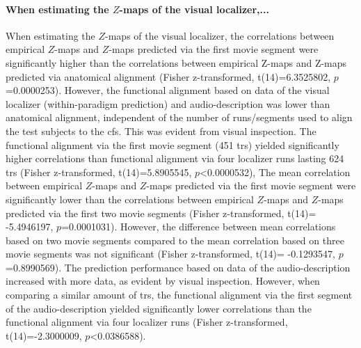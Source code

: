 \paragraph{When estimating the $Z$-maps of the visual localizer,...}
%
When estimating the $Z$-maps of the visual localizer, the correlations between
empirical $Z$-maps and $Z$-maps predicted via the first movie segment were
significantly higher than the correlations between empirical Z-maps and Z-maps
predicted via anatomical alignment (Fisher z-transformed, t(14)=6.3525802,
$p$=0.0000253).
%
However, the functional alignment based on data of the visual localizer
(within-paradigm prediction) and audio-description was lower than anatomical
alignment, independent of the number of runs/segments used to align the test
subjects to the \ac{cfs}. This was evident from visual inspection.
%
The functional alignment via the first movie segment (451 \acp{tr}) yielded
significantly higher correlations than functional alignment via four localizer
runs lasting 624 \acp{tr} (Fisher z-transformed, t(14)=5.8905545,
$p$<0.0000532),
%
The mean correlation between empirical $Z$-maps and $Z$-maps predicted via the
first movie segment were significantly lower than the correlations between
empirical $Z$-maps and $Z$-maps predicted via the first two movie segments
(Fisher z-transformed, t(14)= -5.4946197, $p$=0.0001031).
%
However, the difference between mean correlations based on two movie segments
compared to the mean correlation based on three movie segments was not
significant (Fisher z-transformed, t(14)= -0.1293547, $p$=0.8990569).
%
The prediction performance based on data of the audio-description increased with
more data, as evident by visual inspection.
%
However, when comparing a similar amount of \acp{tr}, the functional alignment
via the first segment of the audio-description yielded significantly lower
correlations than the functional alignment via four localizer runs (Fisher
z-transformed, t(14)=-2.3000009, $p$<0.0386588). 



